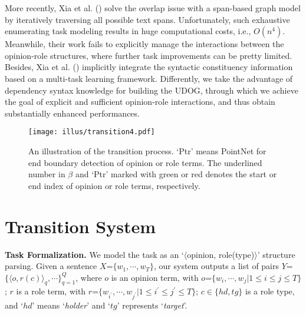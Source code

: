 \documentclass[letterpaper]{article} \usepackage{aaai22}  \usepackage{times}  \usepackage{helvet}  \usepackage{courier}  \usepackage[hyphens]{url}  \usepackage{graphicx} \urlstyle{rm} \def\UrlFont{\rm}  \usepackage{natbib}  \usepackage{caption} \DeclareCaptionStyle{ruled}{labelfont=normalfont,labelsep=colon,strut=off} \frenchspacing  \setlength{\pdfpagewidth}{8.5in}  \setlength{\pdfpageheight}{11in}  \usepackage{algorithm}
\begin{document}
More recently, Xia et al. (\citeyear{xia-etal-2021-unified}) solve the overlap issue with a span-based graph model by iteratively traversing all possible text spans.
Unfortunately, such exhaustive enumerating task modeling results in huge computational costs, i.e., $\mathit{O}(n^4)$.
Meanwhile, their work fails to explicitly manage the interactions between the opinion-role structures, where further task improvements can be pretty limited.
Besides, Xia et al. (\citeyear{xia-etal-2021-unified}) implicitly integrate the syntactic constituency information based on a multi-task learning framework.
Differently, we take the advantage of dependency syntax knowledge for building the UDOG, through which we achieve the goal of explicit and sufficient opinion-role interactions, and thus obtain substantially enhanced performances.

















\begin{figure*}[!t]
\centering
\texttt{[image: illus/transition4.pdf]}
\caption{
An illustration of the transition process. 
`Ptr' means PointNet for end boundary detection of opinion or role terms.
The underlined number in $\beta$ and `Ptr' marked with green or red denotes the start or end index of opinion or role terms, respectively.
}
\label{Transition}
\end{figure*}













\section{Transition System}



\noindent\textbf{Task Formalization.}
We model the task as an `$\langle$opinion, role(type)$\rangle$' structure parsing.
Given a sentence $X$=$\{w_1, \cdots, w_T\}$, our system outputs a list of pairs $Y$=$ \{\langle o, r(c)\rangle_q, \cdots \}_{q=1}^{Q}$,
where $o$ is an opinion term, with $o$=$\{w_i,\cdots, w_j|1$$\le$$i$$\le$$j$$\le$$T\}$;
$r$ is a role term, with $r$=$\{w_{i^{'}},\cdots, w_{j^{'}}|1$$\le$$i^{'}$$\le$$j^{'}$$\le$$T\}$;
$c$$\in$$\{hd, tg\}$ is a role type, and `$hd$' means `\emph{holder}' and `$tg$' represents `\emph{target}'.
\end{document}
